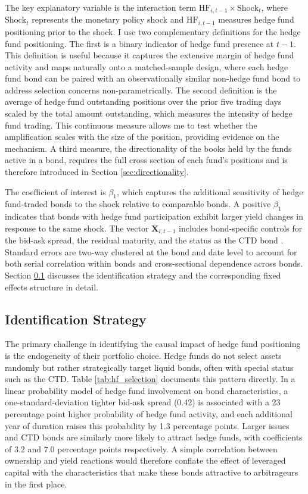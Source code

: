\documentclass[english, 11pt, oneside]{article}
\begin{document}
The key explanatory variable is the interaction term $\text{HF}_{i,t-1} \times \text{Shock}_{t}$, where $\text{Shock}_{t}$ represents the monetary policy shock and $\text{HF}_{i,t-1}$ measures hedge fund positioning prior to the shock. I use two complementary definitions for the hedge fund positioning. The first is a binary indicator of hedge fund presence at $t{-}1$. This definition is useful because it captures the extensive margin of hedge fund activity and maps naturally onto a matched-sample design, where each hedge fund bond can be paired with an observationally similar non-hedge fund bond to address selection concerns non-parametrically. The second definition is the average of hedge fund outstanding positions over the prior five trading days scaled by the total amount outstanding, which measures the intensity of hedge fund trading. This continuous measure allows me to test whether the amplification scales with the size of the position, providing evidence on the mechanism. A third measure, the directionality of the books held by the funds active in a bond, requires the full cross section of each fund's positions and is therefore introduced in Section \ref{sec:directionality}.

The coefficient of interest is $\beta_1$, which captures the additional sensitivity of hedge fund-traded bonds to the shock relative to comparable bonds. A positive $\beta_1$ indicates that bonds with hedge fund participation exhibit larger yield changes in response to the same shock. The vector $\mathbf{X}_{i,t-1}$ includes bond-specific controls for the bid-ask spread, the residual maturity, and the status as the CTD bond \citep{pelizzon2025}. Standard errors are two-way clustered at the bond and date level to account for both serial correlation within bonds and cross-sectional dependence across bonds. Section \ref{sec:identification} discusses the identification strategy and the corresponding fixed effects structure in detail.


\subsection{Identification Strategy}
\label{sec:identification}
The primary challenge in identifying the causal impact of hedge fund positioning is the endogeneity of their portfolio choice. Hedge funds do not select assets randomly but rather strategically target liquid bonds, often with special status such as the CTD. Table \ref{tab:hf_selection} documents this pattern directly. In a linear probability model of hedge fund involvement on bond characteristics, a one-standard-deviation tighter bid-ask spread (0.42) is associated with a 23 percentage point higher probability of hedge fund activity, and each additional year of duration raises this probability by 1.3 percentage points. Larger issues and CTD bonds are similarly more likely to attract hedge funds, with coefficients of 3.2 and 7.0 percentage points respectively. A simple correlation between ownership and yield reactions would therefore conflate the effect of leveraged capital with the characteristics that make these bonds attractive to arbitrageurs in the first place.
\end{document}
